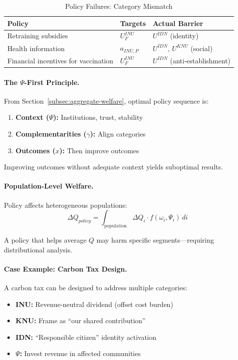 \begin{table}[htbp]
\centering
\caption{Policy Failures: Category Mismatch}
\label{tab:policy-failures}
\renewcommand{\arraystretch}{1.3}
\begin{tabular}{@{}lll@{}}
\toprule
\textbf{Policy} & \textbf{Targets} & \textbf{Actual Barrier} \\
\midrule
Retraining subsidies & $U^{INU}_F$ & $U^{IDN}$ (identity) \\
Health information & $a_{INU,P}$ & $U^{IDN}$, $U^{KNU}$ (social) \\
Financial incentives for vaccination & $U^{INU}_F$ & $U^{IDN}$ (anti-establishment) \\
\bottomrule
\end{tabular}
\end{table}

\paragraph{The $\Psi$-First Principle.}
From Section~\ref{subsec:aggregate-welfare}, optimal policy sequence is:
\begin{enumerate}
\item \textbf{Context ($\Psi$):} Institutions, trust, stability
\item \textbf{Complementarities ($\gamma$):} Align categories
\item \textbf{Outcomes ($x$):} Then improve outcomes
\end{enumerate}

Improving outcomes without adequate context yields suboptimal results.

\paragraph{Population-Level Welfare.}
Policy affects heterogeneous populations:
\begin{equation}
\Delta Q_{policy} = \int_{\text{population}} \Delta Q_i \cdot f(\omega_i, \Psi_i) \, di
\end{equation}

A policy that helps average $Q$ may harm specific segments---requiring
distributional analysis.

\paragraph{Case Example: Carbon Tax Design.}
A carbon tax can be designed to address multiple categories:
\begin{itemize}
\item \textbf{INU:} Revenue-neutral dividend (offset cost burden)
\item \textbf{KNU:} Frame as ``our shared contribution''
\item \textbf{IDN:} ``Responsible citizen'' identity activation
\item \textbf{$\Psi$:} Invest revenue in affected communities
\end{itemize}

